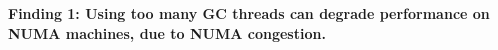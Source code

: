 \textbf{Finding 1: Using too many GC threads can degrade performance on NUMA
machines, due to NUMA congestion.}
